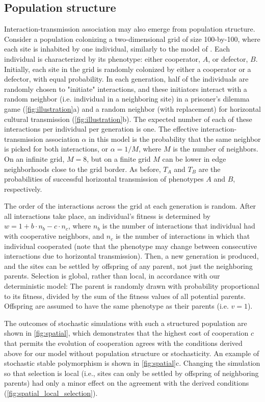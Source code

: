 \documentclass[12pt]{extarticle}
\begin{document}
\subsection*{Population structure}
Interaction-transmission association may also emerge from population structure.
Consider a  population colonizing a two-dimensional grid of size 100-by-100, where each site is inhabited by one individual, similarly to the model of \citet{lewin2020rockpaperscissors}.
Each individual is characterized by its phenotype: either cooperator, $A$, or defector, $B$.
Initially, each site in the grid is randomly colonized by either a cooperator or a defector, with equal probability.
In each generation, half of the individuals are randomly chosen to "initiate" interactions, and these
initiators interact with a random neighbor (i.e. individual in a neighboring site) in a prisoner's dilemma game (\autoref{fig:illustration}a) and a random neighbor (with replacement) for horizontal cultural transmission (\autoref{fig:illustration}b).
The expected number of each of these interactions per individual per generation is one.
The effective interaction-transmission association $\alpha$ in this model is the probability that the same neighbor is picked for both interactions, or $\alpha=1/M$, where $M$ is the number of neighbors.
On an infinite grid, $M=8$, but on a finite grid $M$ can be lower in edge neighborhoods close to the grid border.
As before, $T_A$ and $T_B$ are the probabilities of successful horizontal transmission of phenotypes $A$ and $B$, respectively.

The order of the interactions across the grid at each generation is random.
After all interactions take place, an individual's fitness is determined by
$w = 1 + b \cdot n_b - c \cdot n_c$,
where $n_b$ is the number of interactions that individual had with cooperative neighbors,
and $n_c$ is the number of interactions in which that individual cooperated (note that the phenotype may change between consecutive interactions due to horizontal transmission).
Then, a new generation is produced, and the sites can be settled by offspring of any parent, not just the neighboring parents.
Selection is global, rather than local, in accordance with our deterministic model:
The parent is randomly drawn with probability proportional to its fitness, divided by the sum of the fitness values of all potential parents.
Offspring are assumed to have the same phenotype as their parents (i.e. $v=1$).

The outcomes of stochastic simulations with such a structured population are shown in \autoref{fig:spatial}, which demonstrates that the highest cost of cooperation $c$ that permits the evolution of cooperation agrees with the conditions derived above for our model without population structure or stochasticity.
An example of stochastic stable polymorphism is shown in \autoref{fig:spatial}c.
Changing the simulation so that selection is local (i.e., sites can only be settled by offspring of neighboring parents) had only a minor effect on the agreement with the derived conditions (\autoref{fig:spatial_local_selection}).
\end{document}
